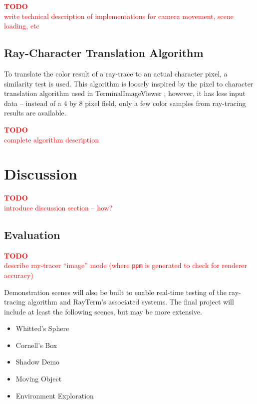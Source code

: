 \documentclass[11pt]{article}
\newcommand{\name}{{\sc RayTerm}}
\newcommand\todo[1]{
\begin{center}
  \textcolor{red}{\bf TODO}\\
  \textcolor{red}{#1}
\end{center}
}
\begin{document}
\todo{write technical description of implementations for camera movement, scene loading, etc}

\subsection{Ray-Character Translation Algorithm}
\label{sec:method:ray_character_algorithm}

To translate the color result of a ray-trace to an actual character pixel, a similarity test is used.
This algorithm is loosely inspired by the pixel to character translation algorithm used in TerminalImageViewer \cite{tivGithub}; however, it has less input data -- instead of a 4 by 8 pixel field, only a few color samples from ray-tracing results are available.

\todo{complete algorithm description}

\section{Discussion}
\label{sec:discussion}

\todo{introduce discussion section -- how?}

\subsection{Evaluation}
\label{sec:evaluate}


\todo{describe ray-tracer ``image'' mode (where \texttt{ppm} is generated to check for renderer accuracy)}


Demonstration scenes will also be built to enable real-time testing of the ray-tracing algorithm and \name's associated systems. The final project will include at least the following scenes, but may be more extensive.

\begin{itemize}
  \setlength\itemsep{-0.25em}
  \item Whitted's Sphere
  \item Cornell's Box
  \item Shadow Demo
  \item Moving Object
  \item Environment Exploration
\end{itemize}
\end{document}
